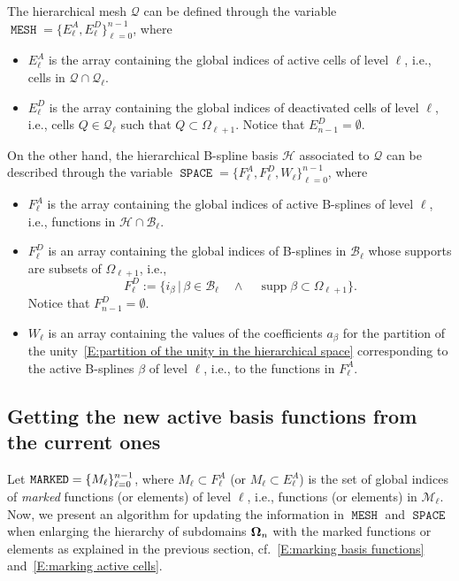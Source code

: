 \documentclass[12pt,a4paper,pdftex]{article}
\theoremstyle{plain}
\theoremstyle{definition}
\theoremstyle{remark}
\DeclareMathOperator{\supp}{supp}
\DeclareMathOperator\mesh{\texttt{MESH}}
\DeclareMathOperator\basis{\texttt{SPACE}}
\DeclareMathOperator\marked{\tt MARKED}
\newcommand\BB{\mathcal B}
\newcommand\MM{\mathcal M}
\newcommand\QQ{\mathcal Q}
\newcommand\HH{\mathcal H}
\begin{document}
The hierarchical mesh $\QQ$ can be defined through the variable $\mesh = \{E^A_\ell,E^D_\ell\}_{\ell=0}^{n-1}$,  where
\begin{itemize}
 \item $E^A_\ell$ is the array containing the global indices of active cells of level $\ell$, i.e., cells in $\QQ\cap\QQ_\ell$.
 \item $E^D_\ell$ is the array containing the global indices of deactivated cells of level $\ell$, i.e., cells $Q\in\QQ_\ell$ such that $Q\subset\Omega_{\ell+1}$. Notice that $E^D_{n-1}=\emptyset$.
 \end{itemize}
 On the other hand, the hierarchical B-spline basis $\HH$ associated to $\QQ$ can be described through the variable $\basis = \{F^A_\ell,F^D_\ell, W_\ell\}_{\ell=0}^{n-1}$, where
\begin{itemize}
 \item $F^A_\ell$ is the array containing the global indices of active B-splines of level $\ell$, i.e., functions in $\HH\cap\BB_\ell$.
  \item  $F^D_\ell$ is an array containing the global indices of B-splines in $\BB_\ell$ whose supports are subsets of $\Omega_{\ell+1}$, i.e.,
$$F^D_\ell:= \{i_\beta\,|\,\beta\in\BB_\ell\quad\wedge\quad \supp\beta\subset\Omega_{\ell+1}\}.$$
Notice that $F^D_{n-1}=\emptyset$. 
 \item $W_\ell$ is an array containing the values of the coefficients $a_\beta$ for the partition of the unity~\eqref{E:partition of the unity in the hierarchical space} corresponding to the active B-splines $\beta$ of level $\ell$, i.e., to the functions in $F^A_\ell$.
\end{itemize}



\subsection{Getting the new active basis functions from the current ones}
 

Let $\marked=\{M_\ell\}_{\ell=0}^{n-1}$, where $M_\ell\subset F^A_\ell$ (or $M_\ell\subset E^A_\ell$) is the set of global indices of \emph{marked} functions (or elements) of level $\ell$, i.e., functions (or elements) in $\MM_\ell$. Now, we present an algorithm for updating the information in $\mesh$ and $\basis$ when enlarging the hierarchy of subdomains ${\bf \Omega}_n$ with the marked functions or elements as explained in the previous section, cf.~\eqref{E:marking basis functions} and~\eqref{E:marking active cells}.
\end{document}
